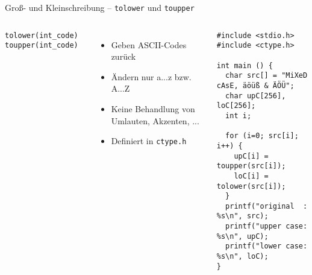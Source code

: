 \begin{frame}[fragile]{Groß- und Kleinschreibung -- \texttt{tolower} und \texttt{toupper}}
%
\begin{columns}[T]
\begin{codebox}[Syntax]
\texttt{tolower(int\_code)}\newline
\texttt{toupper(int\_code)}
\end{codebox}
\begin{itemize}
\item Geben ASCII-Codes zurück
\item Ändern nur a...z bzw. A...Z
\item Keine Behandlung von Umlauten, Akzenten, ...
\item Definiert in \texttt{ctype.h}
\end{itemize}
%
\begin{codebox}
\begin{verbatim}
#include <stdio.h>
#include <ctype.h>

int main () {
  char src[] = "MiXeD cAsE, äöüß & ÄÖÜ";
  char upC[256], loC[256];
  int i;

  for (i=0; src[i]; i++) {
    upC[i] = toupper(src[i]);
    loC[i] = tolower(src[i]);
  }
  printf("original  : %s\n", src);
  printf("upper case: %s\n", upC);
  printf("lower case: %s\n", loC);
}
\end{verbatim}
\end{codebox}
\end{columns}
%
\end{frame}


